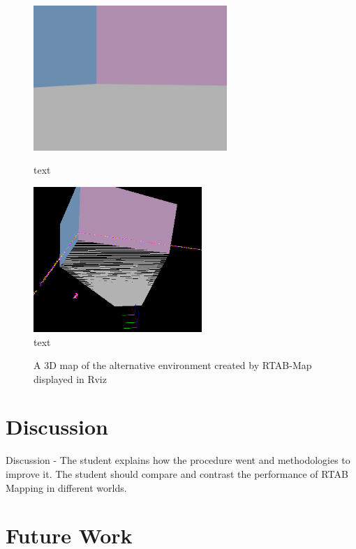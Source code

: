 \documentclass[a4paper]{article}
\begin{document}
\begin{figure}[h]
\centering
\begin{minipage}[t]{0.45\textwidth}
\centering
\includegraphics[height=5.5cm]{slam_house_features_corner_3}
\caption{text}
\end{minipage}
\hspace{1cm}
\begin{minipage}[t]{0.45\textwidth}
\centering
\includegraphics[height=5.5cm]{slam_house_constraints_3}
\caption{text}
\end{minipage}
\end{figure}

\clearpage

\begin{figure}
\centering
{}
\caption{A 3D map of the alternative environment created by RTAB-Map displayed in Rviz}
\end{figure}

\newpage

\section{Discussion}
Discussion - The student explains how the procedure went and methodologies to improve it. The student should compare and contrast the performance of RTAB Mapping in different worlds.


\section{Future Work}




\end{document}

